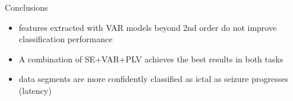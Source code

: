 \documentclass[final,t,overlay, xcolor=table, sans, mathserif]{beamer}
\begin{document}
\begin{frame}{}
\begin{columns}[t]
\begin{column}{.65\linewidth}
\begin{block}{Conclusions}
\begin{itemize}
\item features extracted with VAR models beyond 2nd order do not improve classification performance
\item A combination of SE+VAR+PLV achieves the best results in both tasks
\item data segments are more confidently classified as ictal as seizure progresses (latency)
\end{itemize}
\end{block}




\end{column}
\end{columns}


\end{frame}
\end{document}
